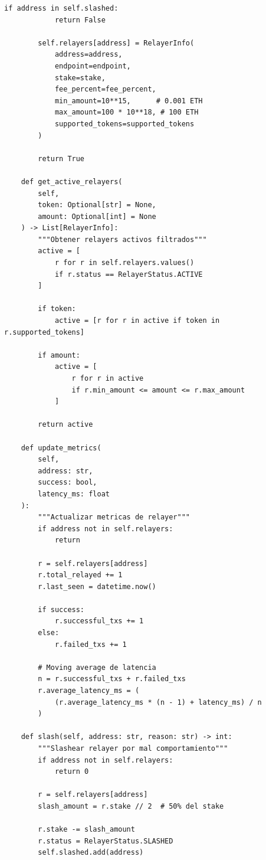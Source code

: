 \documentclass[11pt,a4paper,twoside]{book}
\theoremstyle{definition}
\theoremstyle{remark}
\begin{document}
\begin{lstlisting}[style=python, caption={Sistema de relayers descentralizado}]
        if address in self.slashed:
            return False
        
        self.relayers[address] = RelayerInfo(
            address=address,
            endpoint=endpoint,
            stake=stake,
            fee_percent=fee_percent,
            min_amount=10**15,      # 0.001 ETH
            max_amount=100 * 10**18, # 100 ETH
            supported_tokens=supported_tokens
        )
        
        return True
    
    def get_active_relayers(
        self,
        token: Optional[str] = None,
        amount: Optional[int] = None
    ) -> List[RelayerInfo]:
        """Obtener relayers activos filtrados"""
        active = [
            r for r in self.relayers.values()
            if r.status == RelayerStatus.ACTIVE
        ]
        
        if token:
            active = [r for r in active if token in r.supported_tokens]
        
        if amount:
            active = [
                r for r in active 
                if r.min_amount <= amount <= r.max_amount
            ]
        
        return active
    
    def update_metrics(
        self,
        address: str,
        success: bool,
        latency_ms: float
    ):
        """Actualizar metricas de relayer"""
        if address not in self.relayers:
            return
        
        r = self.relayers[address]
        r.total_relayed += 1
        r.last_seen = datetime.now()
        
        if success:
            r.successful_txs += 1
        else:
            r.failed_txs += 1
        
        # Moving average de latencia
        n = r.successful_txs + r.failed_txs
        r.average_latency_ms = (
            (r.average_latency_ms * (n - 1) + latency_ms) / n
        )
    
    def slash(self, address: str, reason: str) -> int:
        """Slashear relayer por mal comportamiento"""
        if address not in self.relayers:
            return 0
        
        r = self.relayers[address]
        slash_amount = r.stake // 2  # 50% del stake
        
        r.stake -= slash_amount
        r.status = RelayerStatus.SLASHED
        self.slashed.add(address)
        

\end{lstlisting}
\end{document}
